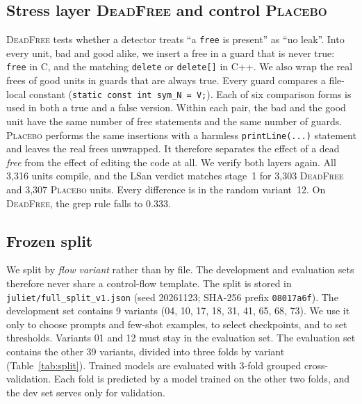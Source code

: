 \documentclass[conference]{IEEEtran}
\newcommand{\Dead}{\textsc{DeadFree}}
\newcommand{\Plac}{\textsc{Placebo}}
\newcommand{\code}[1]{\texttt{#1}}
\begin{document}
\subsection{Stress layer \Dead{} and control \Plac{}}
\Dead{} tests whether a detector treats ``a \code{free} is present'' as ``no leak''.
Into every unit, bad and good alike, we insert a free in a guard that is never true: \code{free} in C, and the matching \code{delete} or \code{delete[]} in C++.
We also wrap the real frees of good units in guards that are always true.
Every guard compares a file-local constant (\code{static const int sym\_N = V;}).
Each of six comparison forms is used in both a true and a false version.
Within each pair, the bad and the good unit have the same number of free statements and the same number of guards. %
\Plac{} performs the same insertions with a harmless \code{printLine(...)} statement and leaves the real frees unwrapped.
It therefore separates the effect of a dead \emph{free} from the effect of editing the code at all.
We verify both layers again. All 3,316 units compile, and the LSan verdict matches stage~1 for 3,303 \Dead{} and 3,307 \Plac{} units. Every difference is in the random variant~12. %
On \Dead{}, the grep rule falls to 0.333. %

\subsection{Frozen split}
We split by \emph{flow variant} rather than by file.
The development and evaluation sets therefore never share a control-flow template.
The split is stored in \code{juliet/full\_split\_v1.json} (seed 20261123; SHA-256 prefix \code{08017a6f}). %
The development set contains 9 variants (04, 10, 17, 18, 31, 41, 65, 68, 73). %
We use it only to choose prompts and few-shot examples, to select checkpoints, and to set thresholds.
Variants 01 and 12 must stay in the evaluation set. %
The evaluation set contains the other 39 variants, divided into three folds by variant (Table~\ref{tab:split}). %
Trained models are evaluated with 3-fold grouped cross-validation. Each fold is predicted by a model trained on the other two folds, and the dev set serves only for validation.
\end{document}
